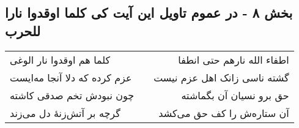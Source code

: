 \begin{center}
\section*{بخش ۸ - در عموم تاویل این آیت کی کلما اوقدوا نارا للحرب}
\label{sec:sh008}
\begin{longtable}{l p{0.5cm} r}
کلما هم اوقدوا نار الوغی
&&
اطفاء الله نارهم حتی انطفا
\\
عزم کرده که دلا آنجا مه‌ایست
&&
گشته ناسی زانک اهل عزم نیست
\\
چون نبودش تخم صدقی کاشته
&&
حق برو نسیان آن بگماشته
\\
گرچه بر آتش‌زنهٔ دل می‌زند
&&
آن ستاره‌ش را کف حق می‌کشد
\\
\end{longtable}
\end{center}
